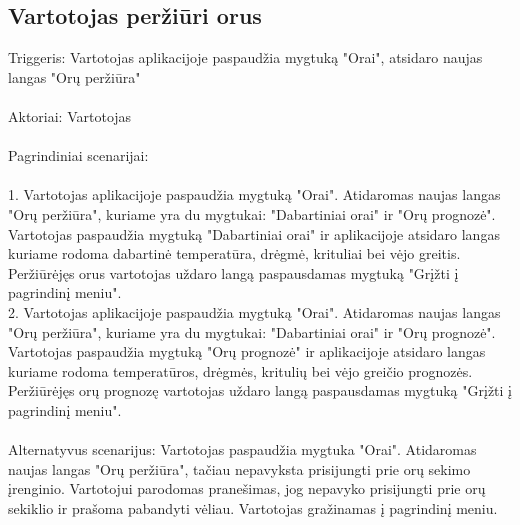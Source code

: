 \documentclass[oneside]{VUMIFPSkursinis}
\begin{document}
\subsection{Vartotojas peržiūri orus}
	Triggeris: Vartotojas aplikacijoje paspaudžia mygtuką "Orai", atsidaro naujas langas "Orų peržiūra" \\ \\
	Aktoriai: Vartotojas \\ \\
	Pagrindiniai scenarijai: \\ \\
1. Vartotojas aplikacijoje paspaudžia mygtuką "Orai". Atidaromas naujas langas "Orų peržiūra", kuriame yra du mygtukai: "Dabartiniai orai" ir "Orų prognozė". 		Vartotojas paspaudžia mygtuką "Dabartiniai orai" ir aplikacijoje atsidaro langas kuriame rodoma dabartinė temperatūra, drėgmė, krituliai bei vėjo greitis. Peržiūrėjęs orus vartotojas uždaro langą paspausdamas mygtuką "Grįžti į pagrindinį meniu". \\
2. Vartotojas aplikacijoje paspaudžia mygtuką "Orai". Atidaromas naujas langas "Orų peržiūra", kuriame yra du mygtukai: "Dabartiniai orai" ir "Orų prognozė". 		Vartotojas paspaudžia mygtuką "Orų prognozė" ir aplikacijoje atsidaro langas kuriame rodoma temperatūros, drėgmės, kritulių bei vėjo greičio prognozės. Peržiūrėjęs orų prognozę vartotojas uždaro langą paspausdamas mygtuką "Grįžti į pagrindinį meniu". \\ \\
	Alternatyvus scenarijus: Vartotojas paspaudžia mygtuka "Orai". Atidaromas naujas langas "Orų peržiūra", tačiau nepavyksta prisijungti prie orų sekimo įrenginio. Vartotojui parodomas pranešimas, jog nepavyko prisijungti prie orų sekiklio ir prašoma pabandyti vėliau. Vartotojas gražinamas į pagrindinį meniu. \\ \\
\end{document}
